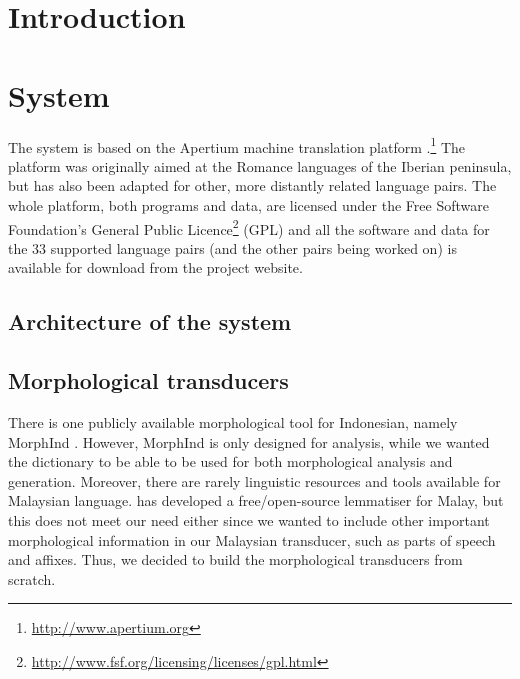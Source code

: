 \documentclass[10pt,a5paper,twoside]{article}
\begin{document}



\newpage
\section{Introduction}

\section{System}
The system is based on the Apertium machine translation platform \citep{forcada11a}.\footnote{\url{http://www.apertium.org}} The platform was originally aimed at the Romance languages of the Iberian peninsula, but has also been adapted for other, more distantly related language pairs. The whole platform, both programs and data, are licensed under the Free Software Foundation's General Public Licence\footnote{\url{http://www.fsf.org/licensing/licenses/gpl.html}} (GPL) and all the software and data for the 33 supported language pairs (and the other pairs being worked on) is available for download from the project website.
\subsection{Architecture of the system}
\subsection{Morphological transducers}
There is one publicly available morphological tool for Indonesian, namely MorphInd \citep{larasati2011indonesian}. However, MorphInd is only designed for analysis, while we wanted the dictionary to be able to be used for both morphological analysis and generation. Moreover, there are rarely linguistic resources and tools available for Malaysian language. \citet{Baldwin06opensource} has developed a free/open-source lemmatiser for Malay, but this does not meet our need either since we wanted to include other important morphological information in our Malaysian transducer, such as parts of speech and affixes. Thus, we decided to build the morphological transducers from scratch.
\end{document}
